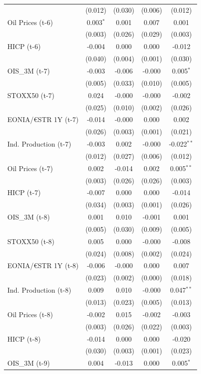 \begin{longtable}[t]{lcccc}
 & (0.012) & (0.030) & (0.006) & (0.012)\\
Oil Prices (t-6) & 0.003$^{*}$ & 0.001 & 0.007 & 0.001\\
 & (0.003) & (0.026) & (0.029) & (0.003)\\
HICP (t-6) & -0.004 & 0.000 & 0.000 & -0.012\\
 & (0.040) & (0.004) & (0.001) & (0.030)\\
OIS\_3M (t-7) & -0.003 & -0.006 & -0.000 & 0.005$^{*}$\\
 & (0.005) & (0.033) & (0.010) & (0.005)\\
STOXX50 (t-7) & 0.024 & -0.000 & -0.000 & -0.002\\
 & (0.025) & (0.010) & (0.002) & (0.026)\\
EONIA/€STR 1Y (t-7) & -0.014 & -0.000 & 0.000 & 0.002\\
 & (0.026) & (0.003) & (0.001) & (0.021)\\
Ind. Production (t-7) & -0.003 & 0.002 & -0.000 & -0.022$^{**}$\\
 & (0.012) & (0.027) & (0.006) & (0.012)\\
Oil Prices (t-7) & 0.002 & -0.014 & 0.002 & 0.005$^{**}$\\
 & (0.003) & (0.026) & (0.026) & (0.003)\\
HICP (t-7) & -0.007 & 0.000 & 0.000 & -0.014\\
 & (0.034) & (0.003) & (0.001) & (0.026)\\
OIS\_3M (t-8) & 0.001 & 0.010 & -0.001 & 0.001\\
 & (0.005) & (0.030) & (0.009) & (0.005)\\
STOXX50 (t-8) & 0.005 & 0.000 & -0.000 & -0.008\\
 & (0.024) & (0.008) & (0.002) & (0.024)\\
EONIA/€STR 1Y (t-8) & -0.006 & -0.000 & 0.000 & 0.007\\
 & (0.023) & (0.002) & (0.000) & (0.018)\\
Ind. Production (t-8) & 0.009 & 0.010 & -0.000 & 0.047$^{**}$\\
 & (0.013) & (0.023) & (0.005) & (0.013)\\
Oil Prices (t-8) & -0.002 & 0.015 & -0.002 & -0.003\\
 & (0.003) & (0.026) & (0.022) & (0.003)\\
HICP (t-8) & -0.014 & 0.000 & 0.000 & -0.020\\
 & (0.030) & (0.003) & (0.001) & (0.023)\\
OIS\_3M (t-9) & 0.004 & -0.013 & 0.000 & 0.005$^{*}$\\

\end{longtable}
